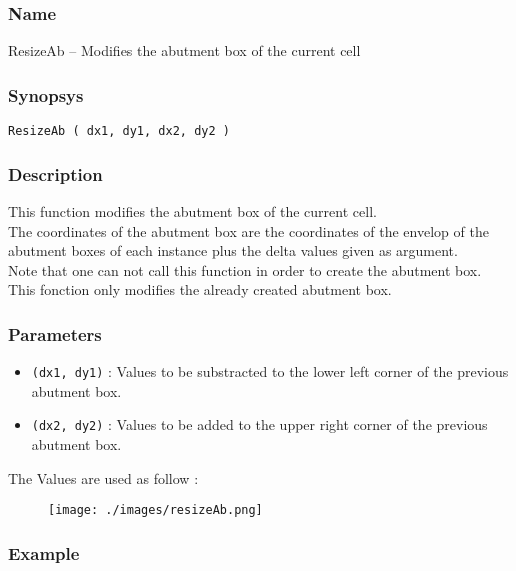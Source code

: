 \subsubsection{Name}

ResizeAb -- Modifies the abutment box of the current cell

\subsubsection{Synopsys}

\begin{verbatim}
ResizeAb ( dx1, dy1, dx2, dy2 )
\end{verbatim}

\subsubsection{Description}

This function modifies the abutment box of the current cell.\\
\indent The coordinates of the abutment box are the coordinates of the envelop of the abutment boxes of each instance plus the delta values given as argument.\\

\indent Note that one can not call this function in order to create the abutment box. This fonction only modifies the already created abutment box.
    
\subsubsection{Parameters}

\begin{itemize}
    \item \verb-(dx1, dy1)- : Values to be substracted to the lower left corner of the previous abutment box.
    \item \verb-(dx2, dy2)- : Values to be added to the upper right corner of the previous abutment box.
\end{itemize}

\indent The Values are used as follow :
\begin{figure}[h!]
\centering
{}
          {\texttt{[image: ./images/resizeAb.png]}}
\end{figure}
      
\subsubsection{Example}

